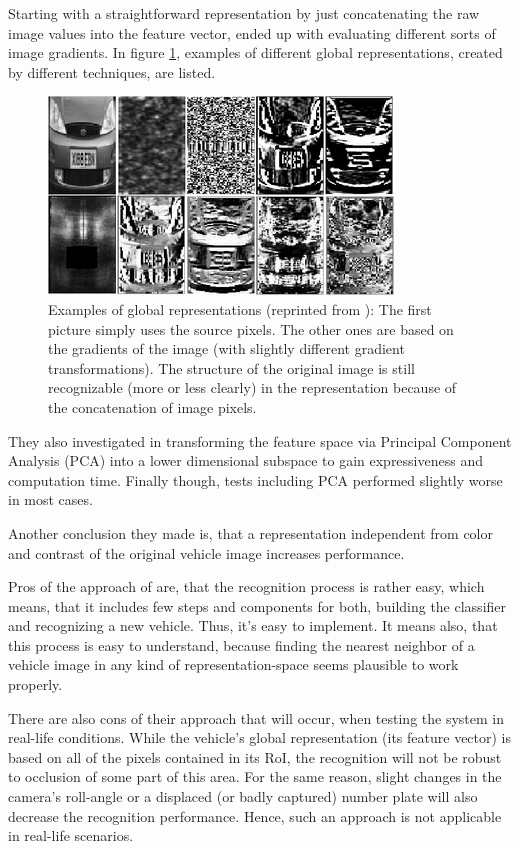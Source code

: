 Starting with a straightforward representation by just concatenating the raw image values into the feature vector, \citeauthor{petrovic2004analysis} ended up with evaluating different sorts of image gradients. In figure \ref{fig:vmmrConcatenation}, examples of different global representations, created by different techniques, are listed.

\begin{figure}[bth]
  \centering
        \includegraphics[width=.65\linewidth]{gfx/vmmr_concatenation_reprint}
        \caption{Examples of global representations (reprinted from \citep{petrovic2004analysis}): The first picture simply uses the source pixels. The other ones are based on the gradients of the image (with slightly different gradient transformations). The structure of the original image is still recognizable (more or less clearly) in the representation because of the concatenation of image pixels.}
        \label{fig:vmmrConcatenation}
\end{figure}

They also investigated in transforming the feature space via Principal Component Analysis (PCA) into a lower dimensional subspace to gain expressiveness and computation time. Finally though, tests including PCA performed slightly worse in most cases.

Another conclusion they made is, that a representation independent from color and contrast of the original vehicle image increases performance.

Pros of the approach of \citeauthor{petrovic2004analysis} are, that the recognition process is rather easy, which means, that it includes few steps and components for both, building the classifier and recognizing a new vehicle. Thus, it's easy to implement. It means also, that this process is easy to understand, because finding the nearest neighbor of a vehicle image in any kind of representation-space seems plausible to work properly.

There are also cons of their approach that will occur, when testing the system in real-life conditions. While the vehicle's global representation (its feature vector) is based on all of the pixels contained in its RoI, the recognition will not be robust to occlusion of some part of this area. For the same reason, slight changes in the camera's roll-angle or a displaced (or badly captured) number plate will also decrease the recognition performance. Hence, such an approach is not applicable in real-life scenarios.

